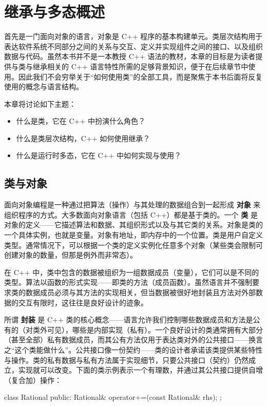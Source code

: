 \chapter{继承与多态概述}

\cppsign{} 首先是一门面向对象的语言，对象是 C++ 程序的基本构建单元。类层次结构用于表达软件系统不同部分之间的关系与交互、定义并实现组件之间的接口、以及组织数据与代码。虽然本书并不是一本教授 C++ 语法的教材，本章的目标是为读者提供与类与继承相关的 C++ 语言特性所需的足够背景知识，便于在后续章节中使用。因此我们不会穷举关于“如何使用类”的全部工具，而是聚焦于本书后面将反复使用的概念与语言结构。

本章将讨论如下主题：

\begin{itemize}
\item 什么是类，它在 C++ 中扮演什么角色？
\item 什么是类层次结构，C++ 如何使用继承？
\item 什么是运行时多态，它在 C++ 中如何实现与使用？
\end{itemize}

\section{类与对象}

面向对象编程是一种通过把算法（操作）与其处理的数据组合到一起形成 \textbf{对象} 来组织程序的方式。大多数面向对象语言（包括 C++）都是基于类的。一个 \textbf{类} 是对象的定义——它描述算法和数据、其组织形式以及与其它类的关系。对象是类的一个具体实例，也就是变量。对象有地址，即内存中的一个位置。类是用户自定义类型。通常情况下，可以根据一个类的定义实例化任意多个对象（某些类会限制可创建对象的数量，但那是例外而非常态）。

在 C++ 中，类中包含的数据被组织为一组数据成员（变量），它们可以是不同的类型。算法以函数的形式实现——即类的方法（成员函数）。虽然语言并不强制要求类的数据成员必须与其方法的实现相关，但当数据被很好地封装且方法对外部数据的交互有限时，这往往是良好设计的迹象。

所谓 \textbf{封装} 是 C++ 类的核心概念——语言允许我们控制哪些数据成员和方法是公有的（对类外可见），哪些是内部实现（私有）。一个良好设计的类通常拥有大部分（甚至全部）私有数据成员，而其公有方法仅用于表达类对外的公共接口——换言之“这个类能做什么”。公共接口像一份契约——类的设计者承诺该类提供某些特性与操作。类的私有数据与私有方法属于实现细节，只要公共接口（契约）仍然成立，实现就可以改变。下面的类示例表示一个有理数，并通过其公共接口提供自增（复合加）操作：

\begin{code}
class Rational { 
public:
  Rational& operator+=(const Rational& rhs);
};
\end{code}

